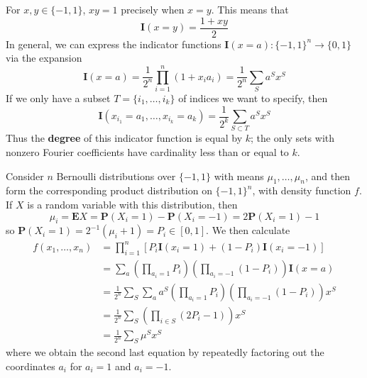 \begin{example}
    For $x,y \in \{ -1, 1 \}$, $xy = 1$ precisely when $x = y$. This means that
    \[ \mathbf{I}(x = y) = \frac{1 + xy}{2} \]
    In general, we can express the indicator functions $\mathbf{I}(x = a): \{ -1, 1 \}^n \to \{ 0, 1 \}$ via the expansion
    \[ \mathbf{I}(x = a) = \frac{1}{2^n} \prod_{i = 1}^n \left( 1 + x_i a_i \right) = \frac{1}{2^n} \sum_S a^S x^S \]
    If we only have a subset $T = \{ i_1, \dots, i_k \}$ of indices we want to specify, then
    \[ \mathbf{I}(x_{i_1} = a_1, \dots, x_{i_k} = a_k) = \frac{1}{2^k} \sum_{S \subset T} a^S x^S \]
    Thus the {\bf degree} of this indicator function is equal by $k$; the only sets  with nonzero Fourier coefficients have cardinality less than or equal to $k$.
\end{example}

\begin{example}
    Consider $n$ Bernoulli distributions over $\{ -1, 1 \}$ with means $\mu_1, \dots, \mu_n$, and then form the corresponding product distribution on $\{ -1, 1 \}^n$, with density function $f$. If $X$ is a random variable with this distribution, then
    \[ \mu_i = \mathbf{E}X = \mathbf{P}(X_i = 1) - \mathbf{P}(X_i = -1) = 2 \mathbf{P}(X_i = 1) - 1 \]
    so $\mathbf{P}(X_i = 1) = 2^{-1} (\mu_i + 1) = P_i \in [0,1]$. We then calculate
    \begin{align*}
        f(x_1, \dots, x_n) &= \prod_{i = 1}^n \left[ P_i \mathbf{I}(x_i = 1) + (1 - P_i) \mathbf{I}(x_i = -1) \right]\\
        &= \sum_a \left( \prod_{a_i = 1} P_i \right) \left( \prod_{a_i = -1} (1 - P_i) \right) \mathbf{I}(x = a)\\
        &= \frac{1}{2^n} \sum_S \sum_a a^S \left( \prod_{a_i = 1} P_i \right) \left( \prod_{a_i = -1} (1 - P_i) \right) x^S\\
        &= \frac{1}{2^n} \sum_S \left( \prod_{i \in S} (2P_i - 1) \right) x^S\\
        &= \frac{1}{2^n} \sum_S \mu^S x^S
    \end{align*}
    where we obtain the second last equation by repeatedly factoring out the coordinates $a_i$ for $a_i = 1$ and $a_i = -1$.
\end{example}

